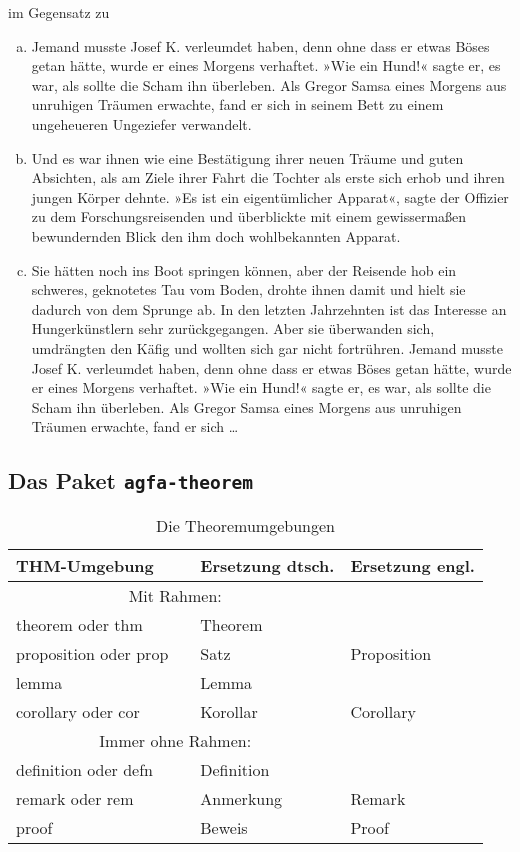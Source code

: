 %
im Gegensatz zu 
%
\begin{enumerate}[(a)]
	\item
	Jemand musste Josef K. verleumdet haben, denn ohne dass er etwas Böses getan hätte, wurde er eines Morgens verhaftet. »Wie ein Hund!« sagte er, es war, als sollte die Scham ihn überleben. Als Gregor Samsa eines Morgens aus unruhigen Träumen erwachte, fand er sich in seinem Bett zu einem ungeheueren Ungeziefer verwandelt. 
	
	\item
	Und es war ihnen wie eine Bestätigung ihrer neuen Träume und guten Absichten, als am Ziele ihrer Fahrt die Tochter als erste sich erhob und ihren jungen Körper dehnte. 
	»Es ist ein eigentümlicher Apparat«, sagte der Offizier zu dem Forschungsreisenden und überblickte mit einem gewissermaßen bewundernden Blick den ihm doch wohlbekannten Apparat. 
	
	\item
	Sie hätten noch ins Boot springen können, aber der Reisende hob ein schweres, geknotetes Tau vom Boden, drohte ihnen damit und hielt sie dadurch von dem Sprunge ab. 
	In den letzten Jahrzehnten ist das Interesse an Hungerkünstlern sehr zurückgegangen. 
	Aber sie überwanden sich, umdrängten den Käfig und wollten sich gar nicht fortrühren.
	Jemand musste Josef K. verleumdet haben, denn ohne dass er etwas Böses getan hätte, wurde er eines Morgens verhaftet. »Wie ein Hund!« sagte er, es war, als sollte die Scham ihn überleben. 
	Als Gregor Samsa eines Morgens aus unruhigen Träumen erwachte, fand er sich \ldots
	
\end{enumerate}
%
\subsection{Das Paket \texttt{agfa-theorem}}\label{subsec:agfa-theorem}
\begin{center}
\begin{table}
\caption{Die Theoremumgebungen}\label{table:thm-umgebung}
\begin{tabular}{lcll}\toprule
THM-Umgebung	&   & Ersetzung dtsch. & Ersetzung engl. \\ \hline 
\multicolumn{3}{c}{Mit Rahmen:}\\ 
theorem oder thm 	&   & Theorem \\
proposition	oder prop	&   & Satz & Proposition \\ 
lemma	&   & Lemma \\ 
corollary oder cor	&   & Korollar & Corollary \\ 
\multicolumn{3}{c}{{Immer ohne Rahmen: } }\\ 
definition	oder defn &   & Definition \\
remark oder rem &   & Anmerkung & Remark \\
proof	&   & Beweis & Proof \\
\bottomrule
\end{tabular}
\end{table}
\end{center}


